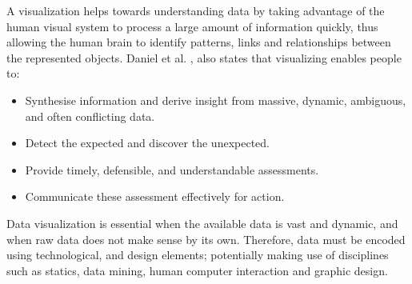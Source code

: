 \fi
A visualization helps towards understanding data  by taking advantage of the human visual system to process a large amount of information quickly, thus allowing the human brain to identify patterns, links and relationships between the represented objects. Daniel et al. \cite{KeimDaniel2010}, also states that visualizing enables people to: 
\begin{displayquote}
	\begin{itemize}
\item  Synthesise information and derive insight from massive, dynamic, ambiguous, and often conflicting data.
\item Detect the expected and discover the unexpected.
\item Provide timely, defensible, and understandable assessments.
\item Communicate these assessment effectively for action.
	\end{itemize}
\end{displayquote}

Data visualization is essential when the available data is vast and dynamic, and when raw data does not make sense by its own. Therefore, data must be encoded using technological, and design elements;  potentially making use of disciplines such as statics, data mining, human computer interaction and graphic design. 

